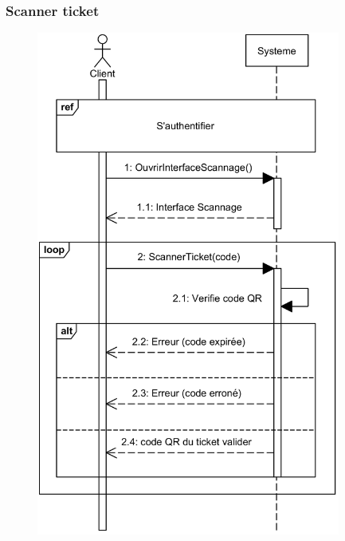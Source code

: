     \subsubsection[Scanner ticket]{Scanner ticket}
        \begin{figure}[H]
            \centering
            \includegraphics[width=100mm]{images/diagramme-de-sequence/sd-scanner.png}
            \label{fig:sdScannerTicket}
        \end{figure}
\pagebreak
